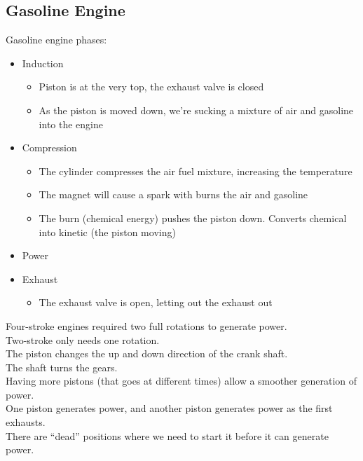 \documentclass[12pt]{article}
\theoremstyle{definition}
\begin{document}
\subsection{Gasoline Engine}
Gasoline engine phases: \\
\begin{itemize}
  \item Induction
    \begin{itemize}
      \item Piston is at the very top, the exhaust valve is closed
      \item As the piston is moved down, we're sucking a mixture of air and gasoline into the engine
    \end{itemize}
  \item Compression
    \begin{itemize}
      \item The cylinder compresses the air fuel mixture, increasing the temperature
      \item The magnet will cause a spark with burns the air and gasoline
      \item The burn (chemical energy) pushes the piston down. Converts chemical into kinetic (the piston moving)
    \end{itemize}
  \item Power
  \item Exhaust
    \begin{itemize}
      \item The exhaust valve is open, letting out the exhaust out
    \end{itemize}
\end{itemize}

Four-stroke engines required two full rotations to generate power. \\
Two-stroke only needs one rotation. \\

The piston changes the up and down direction of the crank shaft. \\
The shaft turns the gears. \\

Having more pistons (that goes at different times) allow a smoother generation of power. \\
One piston generates power, and another piston generates power as the first exhausts. \\

There are ``dead'' positions where we need to start it before it can generate power. \\
\end{document}
